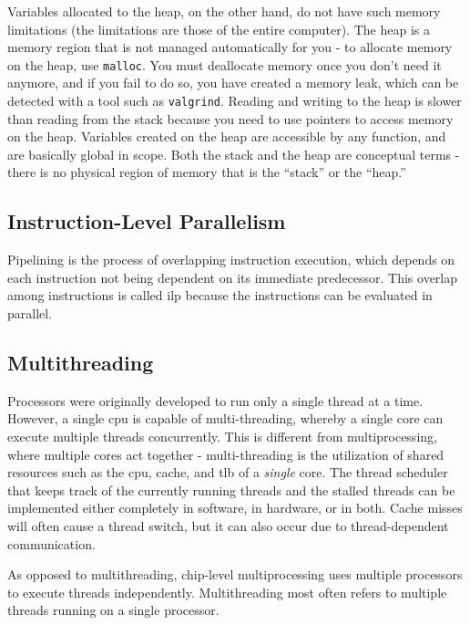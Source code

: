 \documentclass[10pt]{article}
\begin{document}
\begin{flushleft}
Variables allocated to the heap, on the other hand, do not have such memory limitations (the limitations are those of the entire computer). The heap is a memory region that is not managed automatically for you - to allocate memory on the heap, use {\tt malloc}. You must deallocate memory once you don't need it anymore, and if you fail to do so, you have created a memory leak, which can be detected with a tool such as {\tt valgrind}. Reading and writing to the heap is slower than reading from the stack because you need to use pointers to access memory on the heap. Variables created on the heap are accessible by any function, and are basically global in scope. Both the stack and the heap are conceptual terms - there is no physical region of memory that is the ``stack'' or the ``heap.''

\subsection{Instruction-Level Parallelism}
Pipelining is the process of overlapping instruction execution, which depends on each instruction not being dependent on its immediate predecessor. This overlap among instructions is called \gls{ilp} because the instructions can be evaluated in parallel. 

\subsection{Multithreading}
Processors were originally developed to run only a single thread at a time. However, a single \gls{cpu} is capable of multi-threading, whereby a single core can execute multiple threads concurrently. This is different from multiprocessing, where multiple cores act together - multi-threading is the utilization of shared resources such as the \gls{cpu}, cache, and \gls{tlb} of a {\it single} core. The thread scheduler that keeps track of the currently running threads and the stalled threads can be implemented either completely in software, in hardware, or in both. Cache misses will often cause a thread switch, but it can also occur due to thread-dependent communication.

As opposed to multithreading, chip-level multiprocessing uses multiple processors to execute threads independently. Multithreading most often refers to multiple threads running on a single processor.


\end{flushleft}
\end{document}

